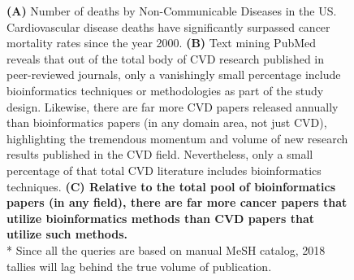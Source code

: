 \documentclass[letter]{bioinfo}
\begin{document}
\begin{figure}[!tpb]
	\caption{\textbf{(A)} Number of deaths by Non-Communicable Diseases in the US.  Cardiovascular disease deaths have significantly surpassed cancer mortality rates since the year 2000.  \textbf{(B)} Text mining PubMed reveals that out of the total body of CVD research published in peer-reviewed journals, only a vanishingly small percentage include bioinformatics techniques or methodologies as part of the study design.  Likewise, there are far more CVD papers released annually than bioinformatics papers (in any domain area, not just CVD), highlighting the tremendous momentum and volume of new research results published in the CVD field.  Nevertheless, only a small percentage of that total CVD literature includes bioinformatics techniques.  \textbf{(C) Relative to the total pool of bioinformatics papers (in any field), there are far more cancer papers that utilize bioinformatics methods than CVD papers that utilize such methods.}\\
	* Since all the queries are based on manual MeSH catalog, 2018 tallies will lag behind the true volume of publication.}
	\label{fig:figure1}
\end{figure}
\end{document}
